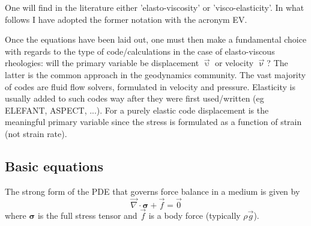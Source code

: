 One will find in the literature either 'elasto-viscosity' or 'visco-elasticity'.
In what follows I have adopted the former notation with the acronym EV.

Once the equations have been laid out, one must then make a fundamental choice 
with regards to the type of code/calculations in the case of elasto-viscous
rheologies: will the primary variable be displacement $\vec{\upupsilon}$ or velocity $\vec\upnu$?
The latter is the common approach in the geodynamics community. The vast majority
of codes are fluid flow solvers, formulated in velocity and pressure. 
Elasticity is usually added to such codes way after they were first used/written (eg ELEFANT, ASPECT, ...). 
For a purely elastic code displacement is the meaningful primary variable since the stress 
is formulated as a function of strain (not strain rate). 






\subsection{Basic equations}

The strong form of the PDE that governs force balance in a medium is given by
\[
\vec{\nabla}\cdot{\bm \sigma}  + \vec{f} = \vec{0}
\]
where ${\bm \sigma}$ is the full stress tensor and $\vec{f}$ is a body force
(typically $\rho \vec{g}$).

